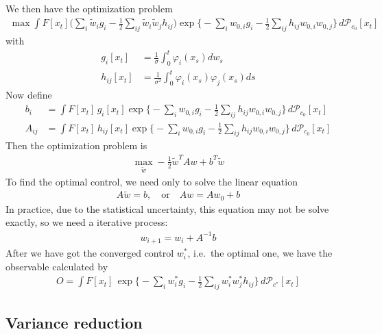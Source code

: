 \documentclass[aip,jcp,a4paper,reprint,onecolumn]{revtex4-1}
\newcommand{\pathmeas}{d\mathcal P}
\begin{document}
We then have the optimization problem
\begin{align}
  \max \int F[x_t]
  \Big ( \sum_i \tilde w_i g_i - \frac12\sum_{ij} \tilde w_i\tilde w_j h_{ij} \Big)
  \exp \Big\{
  - \sum_i w_{0,i} g_i - \frac 12 \sum_{ij} h_{ij} w_{0,i}    w_{0,j} \Big\}
  \,\pathmeas_{c_0}[x_t]
\end{align}
with
\begin{align}\label{eqn:gi}
  g_i[x_t] & = \frac 1\sigma\int_0^t \varphi_i(x_s) dw_s \\\label{eqn:hij}
  h_{ij}[x_t] & = \frac1{\sigma^2} \int_0^t \varphi_i(x_s)  \varphi_j(x_s) ds
\end{align}
Now define
\begin{align}
  b_i & = \int F[x_t]\, g_{i}[x_t] \exp \Big\{
  - \sum_i w_{0,i} g_i - \frac 12 \sum_{ij} h_{ij} w_{0,i}    w_{0,j} \Big\}
  \,\pathmeas_{c_0}[x_t]\\
  A_{ij} & = \int F[x_t]\, h_{ij}[x_t] \exp \Big\{
  - \sum_i w_{0,i} g_i - \frac 12 \sum_{ij} h_{ij} w_{0,i}    w_{0,j} \Big\}
  \,\pathmeas_{c_0}[x_t]
\end{align}
Then the optimization problem is
\begin{align}
  \max_{\tilde w } -\frac 12 \tilde w^T A w + b^T \tilde w
\end{align}
To find the optimal control, we need only to solve the linear equation
\begin{align}
  A\tilde w = b, \quad \textrm{or}\quad A w = A w_0 + b
\end{align}
In practice, due to the statistical uncertainty, this equation may not
be solve exactly, so we need a iterative process:
\begin{align}
  w_{i+1} = w_i + A^{-1}b
\end{align}
After we have got the converged control $w_i^\ast$,
i.e.~the optimal one, we have
the observable calculated by
\begin{align}\label{eqn:fin-obs}
  O = \int F[x_t]\,
  \exp\Big\{
  -\sum_iw^\ast_i g_i -\frac12\sum_{ij}w^\ast_iw^\ast_jh_{ij}
  \Big\}\,
  \pathmeas_{c^\ast}[x_t]
\end{align}

\subsection{Variance reduction}
\end{document}
